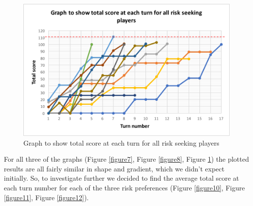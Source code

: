 \documentclass[a4paper,titlepage]{article}
\begin{document}
\begin{figure}
\center
\includegraphics[scale=1]{seeking_graph}
\caption{Graph to show total score at each turn for all risk seeking players\label{figure9}}
\end{figure}
For all three of the graphs (Figure \ref{figure7}, Figure \ref{figure8}, Figure \ref{figure9}) the plotted results are all fairly similar in shape and gradient, which we didn’t expect initially. So, to investigate further we decided to find the average total score at each turn number for each of the three risk preferences (Figure \ref{figure10}, Figure \ref{figure11}, Figure \ref{figure12}).
\end{document}
